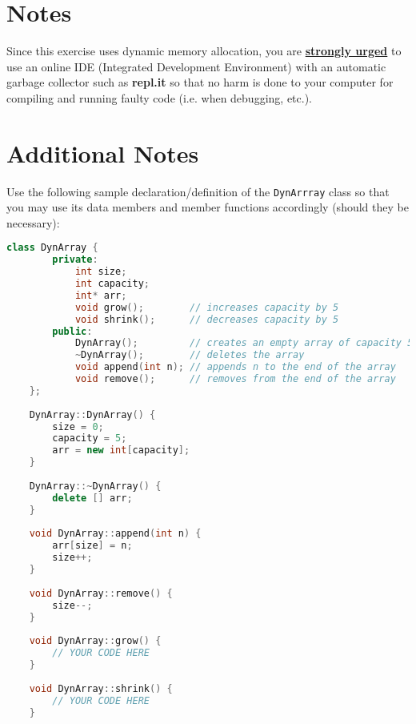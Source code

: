 \documentclass[11 pt]{article}
\begin{document}
\section{Notes}

Since this exercise uses dynamic memory allocation, you are \textbf{\underline{strongly urged}} to use an online IDE (Integrated Development Environment) with an automatic garbage collector such as \textbf{repl.it} so that no harm is done to your computer for compiling and running faulty code (i.e. when debugging, etc.).

\newpage

\section{Additional Notes}

Use the following sample declaration/definition of the \texttt{DynArrray} class so that you may use its data members and member functions accordingly (should they be necessary):

\begin{lstlisting}[language=C++]
    class DynArray {
        private:
            int size;
            int capacity;
            int* arr;
            void grow();        // increases capacity by 5
            void shrink();      // decreases capacity by 5
        public:
            DynArray();         // creates an empty array of capacity 5
            ~DynArray();        // deletes the array
            void append(int n); // appends n to the end of the array
            void remove();      // removes from the end of the array
    };
    
    DynArray::DynArray() {
        size = 0;
        capacity = 5;
        arr = new int[capacity];
    }
    
    DynArray::~DynArray() {
        delete [] arr;
    }
    
    void DynArray::append(int n) {
        arr[size] = n;
        size++;
    }
    
    void DynArray::remove() {
        size--;
    }
    
    void DynArray::grow() {
        // YOUR CODE HERE
    }
    
    void DynArray::shrink() {
        // YOUR CODE HERE
    }
\end{lstlisting}
\end{document}
